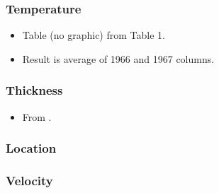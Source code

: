 \documentclass[article,a4paper,times,11pt,twoside]{article}
\begin{document}
\subsubsection{Temperature}
\label{sec:orgbc756b5}

\begin{itemize}
\item Table (no graphic) from \textcite{paterson_1968} Table 1.
\item Result is average of 1966 and 1967 columns.
\end{itemize}

\subsubsection{Thickness}
\label{sec:org766730b}

\begin{itemize}
\item From \textcite{paterson_1968}.
\end{itemize}

\subsubsection{Location}
\label{sec:org21ae4f3}

\subsubsection{Velocity}
\label{sec:org2295934}
\clearpage
\end{document}
